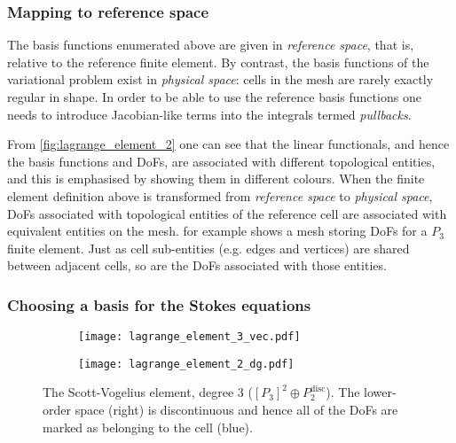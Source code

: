 \documentclass[thesis]{subfiles}
\begin{document}
\subsubsection{Mapping to reference space}


The basis functions enumerated above are given in \textit{reference space}, that is, relative to the reference finite element.
By contrast, the basis functions of the variational problem exist in \textit{physical space}: cells in the mesh are rarely exactly regular in shape.
In order to be able to use the reference basis functions one needs to introduce Jacobian-like terms into the integrals termed \textit{pullbacks}.

From \cref{fig:lagrange_element_2} one can see that the linear functionals, and hence the basis functions and DoFs, are associated with different topological entities, and this is emphasised by showing them in different colours.
When the finite element definition above is transformed from \textit{reference space} to \textit{physical space}, DoFs associated with topological entities of the reference cell are associated with equivalent entities on the mesh.
 for example shows a mesh storing DoFs for a $P_3$ finite element.
Just as cell sub-entities (e.g. edges and vertices) are shared between adjacent cells, so are the DoFs associated with those entities.


\subsubsection{Choosing a basis for the Stokes equations}

\begin{figure}
  \centering
  \begin{subfigure}{.35\textwidth}
    \centering
    \texttt{[image: lagrange\_element\_3\_vec.pdf]}
    \label{fig:scott_vogelius_element_P3}
  \end{subfigure}
  \begin{subfigure}{.35\textwidth}
    \centering
    \texttt{[image: lagrange\_element\_2\_dg.pdf]}
  \end{subfigure}
  \caption{
    The Scott-Vogelius element, degree 3 ($[P_3]^2 \oplus P_2^\mathrm{disc}$).
    The lower-order space (right) is discontinuous and hence all of the DoFs are marked as belonging to the cell (blue).
  }
  \label{fig:scott_vogelius_element}
\end{figure}
\end{document}
